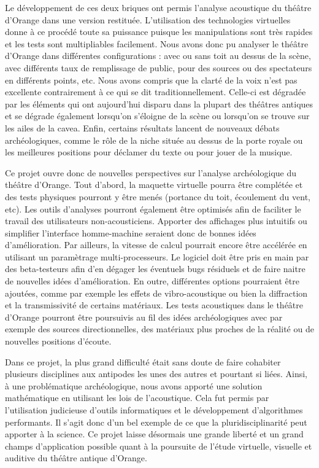 Le développement de ces deux briques ont permis l'analyse acoustique du théâtre d'Orange dans une version restituée. L'utilisation des technologies virtuelles donne à ce procédé toute sa puissance puisque les manipulations sont très rapides et les tests sont multipliables facilement. Nous avons donc pu analyser le théâtre d'Orange dans différentes configurations : avec ou sans toit au dessus de la scène, avec différents taux de remplissage de public, pour des sources ou des spectateurs en différents points, etc. Nous avons compris que la clarté de la voix n'est pas excellente contrairement à ce qui se dit traditionnellement. Celle-ci est dégradée par les éléments qui ont aujourd'hui disparu dans la plupart des théâtres antiques et se dégrade également lorsqu'on s'éloigne de la scène ou lorsqu'on se trouve sur les ailes de la \gls{cavea}. Enfin, certains résultats lancent de nouveaux débats archéologiques, comme le rôle de la niche située au dessus de la porte royale ou les meilleures positions pour déclamer du texte ou pour jouer de la musique.

Ce projet ouvre donc de nouvelles perspectives sur l'analyse archéologique du théâtre d'Orange. Tout d'abord, la maquette virtuelle pourra être complétée et des tests physiques pourront y être menés (portance du toit, écoulement du vent, etc). Les outils d'analyses pourront également être optimisés afin de faciliter le travail des utilisateurs non-acousticiens. Apporter des affichages plus intuitifs \cite[]{immersive} ou simplifier l'interface homme-machine seraient donc de bonnes idées d'amélioration. Par ailleurs, la vitesse de calcul pourrait encore être accélérée en utilisant un paramètrage multi-processeurs. Le logiciel doit être pris en main par des beta-testeurs afin d'en dégager les éventuels bugs résiduels et de faire naitre de nouvelles idées d'amélioration. En outre, différentes options pourraient être ajoutées, comme par exemple les effets de vibro-acoustique ou bien la diffraction et la transmissivité de certains matériaux. Les tests acoustiques dans le théâtre d'Orange pourront être poursuivis au fil des idées archéologiques avec par exemple des sources directionnelles, des matériaux plus proches de la réalité ou de nouvelles positions d'écoute. 

Dans ce projet, la plus grand difficulté était sans doute de faire cohabiter plusieurs disciplines aux antipodes les unes des autres et pourtant si liées. Ainsi, à une problématique archéologique, nous avons apporté une solution mathématique en utilisant les lois de l'acoustique. Cela fut permis par l'utilisation judicieuse d'outils informatiques et le développement d'algorithmes performants. Il s'agit donc d'un bel exemple de ce que la pluridisciplinarité peut apporter à la science. Ce projet laisse désormais une grande liberté et un grand champs d'application possible quant à la poursuite de l'étude virtuelle, visuelle et auditive du théâtre antique d'Orange.